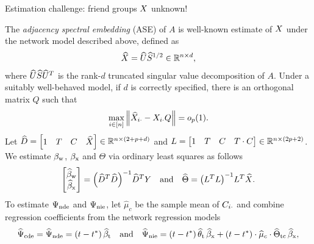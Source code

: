 \documentclass[final]{beamer}
\newlength{\colwidth}
\begin{document}
\begin{frame}[t]
\begin{columns}[t]
\begin{column}{\colwidth}
            \begin{block}{Estimation challenge: friend groups $X$ unknown!}

                The \emph{adjacency spectral embedding} (ASE) of $A$ is well-known estimate of $X$ under the network model described above, defined as
                \begin{equation*}
                    \widehat{X} = \widehat{U} \widehat{S}^{1/2} \in \mathbb{R}^{n \times d},
                \end{equation*}
                where $\widehat{U} \widehat{S} \widehat{U}^T$ is the rank-$d$ truncated singular value decomposition of $A$. Under a suitably well-behaved model, if $d$ is correctly specified, there is an orthogonal matrix $Q$ such that
                \begin{equation*}
                    \max_{i \in [n]} \, \norm*{\Xhat_{i \cdot} - \X_{i \cdot} Q} = \op{1}.
                \end{equation*}
                Let $\widehat{D} = \begin{bmatrix} 1 & T & C& \widehat{X} \end{bmatrix} \in \mathbb{R}^{n \times (2 + p + d)}$ and $L = \begin{bmatrix} 1 & T & C & T \cdot C \end{bmatrix} \in \mathbb{R}^{n \times (2 p + 2)}$. We estimate $\beta_\text{w}$, $\beta_\text{x}$ and $\Theta$ via ordinary least squares as follows
                \begin{equation*}
                    \begin{bmatrix}
                        \betawhat \\
                        \betaxhat
                    \end{bmatrix}
                    = \paren*{\Dhat^T \Dhat}^{-1} \Dhat^T Y
                    \quad \text{and} \quad
                    \Thetahat
                    = \paren*{\Wfull^T \Wfull}^{-1} \Wfull^T \Xhat.
                \end{equation*}
                To estimate $\Psi_\mathrm{nde}$ and $\Psi_\mathrm{nie}$, let $\widehat{\mu}_c$ be the sample mean of $C_{i \cdot}$ and combine regression coefficients from the network regression models
                \begin{align*}
                    \cdehat  = \ndehat = \paren*{t - t^*} \, \betathat
                    \quad \text{and} \quad
                    \niehat  = \paren*{t - t^*} \, \thetathat \, \betaxhat + \paren*{t - t^*} \cdot \widehat{\mu}_c \cdot \Thetatchat \, \betaxhat,
                \end{align*}
            \end{block}



\end{column}
\end{columns}
\end{frame}
\end{document}
